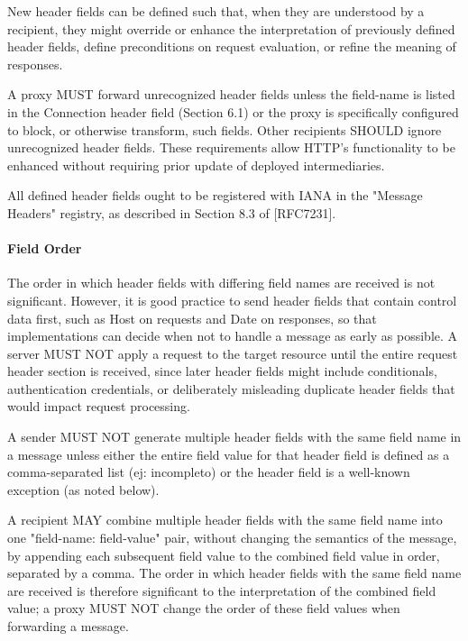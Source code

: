 New header fields can be defined such that, when they are understood
by a recipient, they might override or enhance the interpretation of
previously defined header fields, define preconditions on request
evaluation, or refine the meaning of responses.

A proxy MUST forward unrecognized header fields unless the field-name
is listed in the Connection header field (Section 6.1) or the proxy
is specifically configured to block, or otherwise transform, such
fields.  Other recipients SHOULD ignore unrecognized header fields.
These requirements allow HTTP's functionality to be enhanced without
requiring prior update of deployed intermediaries.

All defined header fields ought to be registered with IANA in the
"Message Headers" registry, as described in Section 8.3 of [RFC7231].
\paragraph{Field Order}
The order in which header fields with differing field names are
   received is not significant.  However, it is good practice to send
   header fields that contain control data first, such as Host on
   requests and Date on responses, so that implementations can decide
   when not to handle a message as early as possible.  A server MUST NOT
   apply a request to the target resource until the entire request
   header section is received, since later header fields might include
   conditionals, authentication credentials, or deliberately misleading
   duplicate header fields that would impact request processing.

   A sender MUST NOT generate multiple header fields with the same field
   name in a message unless either the entire field value for that
   header field is defined as a comma-separated list (ej: incompleto) 
   or the header field is a well-known exception (as noted below).

   A recipient MAY combine multiple header fields with the same field
   name into one "field-name: field-value" pair, without changing the
   semantics of the message, by appending each subsequent field value to
   the combined field value in order, separated by a comma.  The order
   in which header fields with the same field name are received is
   therefore significant to the interpretation of the combined field
   value; a proxy MUST NOT change the order of these field values when
   forwarding a message.

